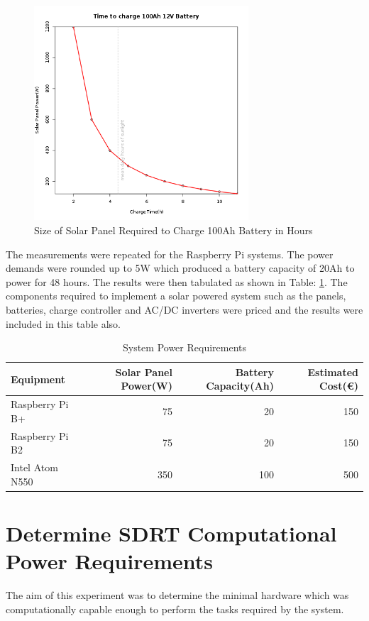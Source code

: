 \documentclass[runningheads,a4paper]{llncs}
\begin{document}
%
\begin{figure}[!htb]
	\centering
	\includegraphics[width=8cm]{images/65}
	\caption{Size of Solar Panel Required to Charge 100Ah Battery in Hours}
	\label{fig:lineplot_solar_panel_battery_capacity_hours}
\end{figure}
%

The measurements were repeated for the Raspberry Pi systems. The power demands were rounded up to 5W which produced a battery capacity of 20Ah to power for 48 hours. The results were then tabulated as shown in Table: \ref{tab:system_power_requirements}. The components required to implement a solar powered system such as the panels, batteries, charge controller and AC/DC inverters were priced and the results were included in this table also.

%
\begin{table}
	\centering
	\begin{tabular}{l r r r}
		\toprule
		Equipment & Solar Panel Power(W) & Battery Capacity(Ah) & Estimated Cost(\euro)\\ \midrule
		Raspberry Pi B+ & 75 & 20 & 150 \\
		Raspberry Pi B2 & 75 & 20 & 150 \\
		Intel Atom N550 & 350 & 100 & 500 \\
		\bottomrule
	\end{tabular}
	\caption{System Power Requirements}
	\label{tab:system_power_requirements}
\end{table}
%


\newpage
\section*{Determine SDRT Computational Power Requirements}
The aim of this experiment was to determine the minimal hardware which was computationally capable enough to perform the tasks required by the system.
\end{document}

